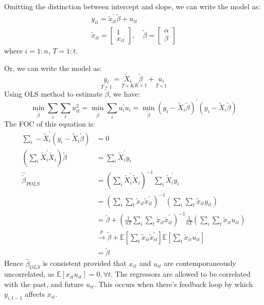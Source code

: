 Omitting the distinction between intercept and slope, we can write the model as:
\begin{gather*}
  y_{it} = \tilde{x}_{it}^{\prime} \tilde{\beta} + u_{it} \\
  \tilde{x}_{it} = \begin{bmatrix}
    1 \\
    x_{it}
  \end{bmatrix}, \quad
  \tilde{\beta} = \begin{bmatrix}
    \alpha \\
    \beta
  \end{bmatrix}
\end{gather*}
where $i=1:n$, $T=1:t$.

Or, we can write the model as: 
\[ 
\underset{T\times 1}{y_i} = \underset{T \times K}{\tilde{X}_i} \underset{K \times 1}{\tilde{\beta}} + \underset{T \times 1}{u_i}
\]
Using OLS method to estimate $\tilde{\beta}$, we have:
\[
\underset{\tilde{\beta}}{\min} \sum_i \sum_t u_{it}^2 = \underset{\tilde{\beta}}{\min} \sum_i u_i^{\prime} u_i = \underset{\tilde{\beta}}{\min} (y_i - \tilde{X}_i \tilde{\beta})^{\prime} (y_i - \tilde{X}_i \tilde{\beta})
\]
The FOC of this equation is:
\begin{align*}
  \sum_i -\tilde{X}_i^{\prime} (y_i - \tilde{X}_i \tilde{\beta}) &= 0 \\
  \left(\sum_i \tilde{X}_i^{\prime} \tilde{X}_i \right) \tilde{\beta} &= \sum_i \tilde{X}_i^{\prime} y_i \\
  \hat{\tilde{\beta}}_{POLS} &= \left(\sum_i \tilde{X}_i^{\prime} \tilde{X}_i \right)^{-1} \sum_i \tilde{X}_i^{\prime} y_i \\
  &= \left(\sum_i \sum_t \tilde{x}_{it} \tilde{x}_{it}^{\prime} \right)^{-1} \left( \sum_i \sum_t \tilde{x}_{it} y_{it} \right) \\
  &= \tilde{\beta} + \left(\frac{1}{nT} \sum_i \sum_t \tilde{x}_{it} \tilde{x}_{it}^{\prime} \right)^{-1} \frac{1}{nT} \left( \sum_i \sum_t \tilde{x}_{it} u_{it} \right) \\
  & \overset{p}{\rightarrow} \tilde{\beta} + \mathbb{E}\left[\sum_t \tilde{x}_{it} \tilde{x}_{it}^{\prime} \right] \mathbb{E}\left[\sum_t \tilde{x}_{it} u_{it} \right] \\
  &= \tilde{\beta}
\end{align*}
Hence $\hat{\beta}_{OLS}$ is consistent provided that $x_{it}$ and $u_{it}$ are contemporaneously uncorrelated,
as $\mathbb{E}[x_{it} u_{it}] = 0, \forall t.$
The regressors are allowed to be correlated with the past, and future $u_{it}$.
This occurs when there's feedback loop by which $y_{i,t-1}$ affects $x_{it}$.

